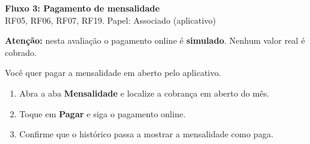 \documentclass[11pt,a4paper]{article}
\newcommand{\aviso}[1]{%
  \noindent\colorbox{lightbg}{%
    \begin{minipage}{0.95\linewidth}
    \vspace{1mm}
    #1
    \vspace{1mm}
    \end{minipage}%
  }\vspace{3mm}
}
\begin{document}
\begin{center}
  {\LARGE\bfseries\color{brandgreen} Fluxo 3: Pagamento de mensalidade}\\[1mm]
  {\large RF05, RF06, RF07, RF19. Papel: Associado (aplicativo)}
\end{center}

\vspace{2mm}
\aviso{\textbf{Atenção:} nesta avaliação o pagamento online é \textbf{simulado}. Nenhum valor real é
cobrado.}

Você quer pagar a mensalidade em aberto pelo aplicativo.

\begin{enumerate}[leftmargin=6mm]
  \item Abra a aba \textbf{Mensalidade} e localize a cobrança em aberto do mês.
  \item Toque em \textbf{Pagar} e siga o pagamento online.
  \item Confirme que o histórico passa a mostrar a mensalidade como paga.
\end{enumerate}
\end{document}
